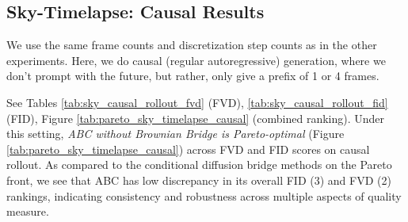 \subsection{Sky-Timelapse: Causal Results}\label{sec:causal_sky_timelapse}

We use the same frame counts and discretization step counts as in the other experiments. Here, we do causal (regular autoregressive) generation, where we don't prompt with the future, but rather, only give a prefix of 1 or 4 frames.

See Tables \ref{tab:sky_causal_rollout_fvd} (FVD), \ref{tab:sky_causal_rollout_fid} (FID), Figure \ref{tab:pareto_sky_timelapse_causal} (combined ranking).
Under this setting, \textit{ABC without Brownian Bridge is Pareto-optimal} (Figure \ref{tab:pareto_sky_timelapse_causal}) across FVD and FID scores on causal rollout. As compared to the conditional diffusion bridge methods on the Pareto front, we see that ABC has low discrepancy in its overall FID (3) and FVD (2) rankings, indicating consistency and robustness across multiple aspects of quality measure.





